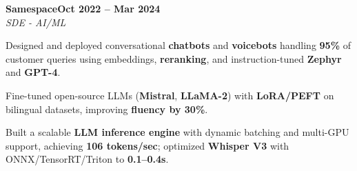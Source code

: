 \documentclass[letterpaper,10pt]{article}
\newcommand{\heading}[2]{
  \hspace{10pt}#1\hfill#2\\
}
\newcommand{\headingBf}[2]{
  \heading{\textbf{#1}}{\textbf{#2}}
}
\newcommand{\headingIt}[2]{
  \heading{\textit{#1}}{\textit{#2}}
}
\newenvironment{resume_list}{
  \vspace{-7pt}
  \begin{itemize}[itemsep=-2px, parsep=1pt, leftmargin=30pt]
}{
  \end{itemize}
}
\begin{document}
  


  \headingBf{Samespace}{Oct 2022 -- Mar 2024}
\headingIt{SDE - AI/ML}{}
\begin{resume_list}
  \item Designed and deployed conversational \textbf{chatbots} and \textbf{voicebots} handling \textbf{95\%} of customer queries using embeddings, \textbf{reranking}, and instruction-tuned \textbf{Zephyr} and \textbf{GPT-4}.
  \item Fine-tuned open-source LLMs (\textbf{Mistral}, \textbf{LLaMA-2}) with \textbf{LoRA/PEFT} on bilingual datasets, improving \textbf{fluency by 30\%}.
  \item Built a scalable \textbf{LLM inference engine} with dynamic batching and multi-GPU support, achieving \textbf{106 tokens/sec}; optimized \textbf{Whisper V3} with ONNX/TensorRT/Triton to \textbf{0.1--0.4s}.
\end{resume_list}


\end{document}
